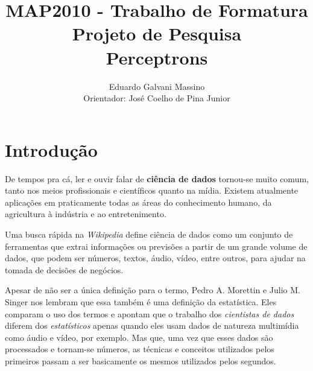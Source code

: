 \documentclass[12pt,brazil]{article}
\newcommand{\defi}[1]{\textbf{#1}}
\begin{document}


\onehalfspacing %

\title{MAP2010 - Trabalho de Formatura \\
       Projeto de Pesquisa \\
       Perceptrons}

\author{Eduardo Galvani Massino \\
        Orientador: José Coelho de Pina Junior}

\date{}

\maketitle


\singlespacing

\section{Introdução}

De tempos pra cá, ler e ouvir falar de \defi{ciência de dados} tornou-se muito comum, tanto nos meios profissionais e científicos quanto na mídia. Existem atualmente aplicações em praticamente todas as áreas do conhecimento humano, da agricultura à indústria e ao entretenimento.

Uma busca rápida na \emph{Wikipedia} \citep{wiki} define ciência de dados como um conjunto de ferramentas que extrai informações ou previsões a partir de um grande volume de dados, que podem ser números, textos, áudio, vídeo, entre outros, para ajudar na tomada de decisões de negócios.

Apesar de não ser a única definição para o termo, Pedro A. Morettin e Julio M. Singer \citep{apostila} nos lembram que essa também é uma definição da estatística. Eles comparam o uso dos termos e apontam que o trabalho dos \emph{cientistas de dados} diferem dos \emph{estatísticos} apenas quando eles usam dados de natureza multimídia como áudio e vídeo, por exemplo. Mas que, uma vez que esses dados são processados e tornam-se números, as técnicas e conceitos utilizados pelos primeiros passam a ser basicamente os mesmos utilizados pelos segundos.
\end{document}
